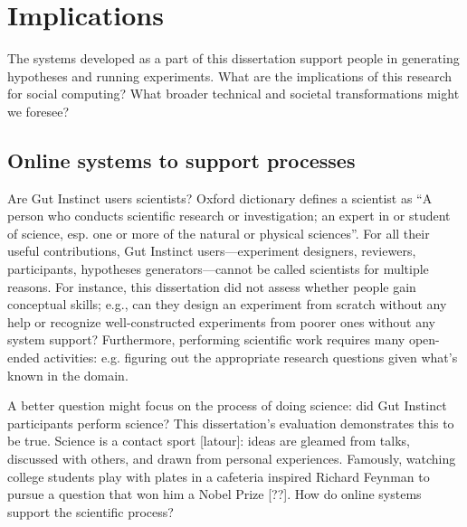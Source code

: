 
\section{Implications}

The systems developed as a part of this dissertation support people in generating hypotheses and running experiments. What are the implications of this research for social computing? What broader technical and societal transformations might we foresee?

\subsection{Online systems to support processes}
Are Gut Instinct users scientists? Oxford dictionary defines a scientist as “A person who conducts scientific research or investigation; an expert in or student of science, esp. one or more of the natural or physical sciences”. For all their useful contributions, Gut Instinct users---experiment designers, reviewers, participants, hypotheses generators---cannot be called scientists for multiple reasons. For instance, this dissertation did not assess whether people gain conceptual skills; e.g., can they design an experiment from scratch without any help or recognize well-constructed experiments from poorer ones without any system support? Furthermore, performing scientific work requires many open-ended activities: e.g. figuring out the appropriate research questions given what’s known in the domain.

A better question might focus on the process of doing science: did Gut Instinct participants perform science? This dissertation's evaluation demonstrates this to be true. Science is a contact sport [latour]: ideas are gleamed from talks, discussed with others, and drawn from personal experiences. Famously, watching college students play with plates in a cafeteria inspired Richard Feynman to pursue a question that won him a Nobel Prize [??]. How do online systems support the scientific process?
  
